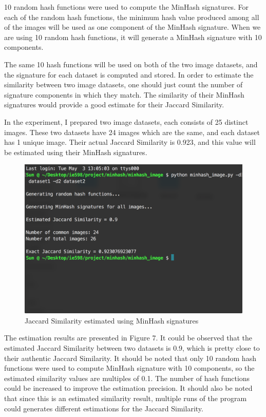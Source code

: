\documentclass[letterpaper,12pt]{article}
\begin{document}
10 random hash functions were used to compute the MinHash signatures. For each of the random hash functions, the minimum hash value produced among all of the images will be used as one component of the MinHash signature. When we are using 10 random hash functions, it will generate a MinHash signature with 10 components. 

The same 10 hash functions will be used on both of the two image datasets, and the signature for each dataset is computed and stored. In order to estimate the similarity between two image datasets, one should just count the number of signature components in which they match. The similarity of their MinHash signatures would provide a good estimate for their Jaccard Similarity.

In the experiment, I prepared two image datasets, each consists of 25 distinct images. These two datasets have 24 images which are the same, and each dataset has 1 unique image. Their actual Jaccard Similarity is 0.923, and this value will be estimated using their MinHash signatures.

\begin{figure}[h!]
	\centering
	\includegraphics[scale=0.5]{figures/figure_7}
	\caption{Jaccard Similarity estimated using MinHash signatures}
\end{figure}

The estimation results are presented in Figure 7. It could be observed that the estimated Jaccard Similarity between two datasets is 0.9, which is pretty close to their authentic Jaccard Similarity. It should be noted that only 10 random hash functions were used to compute MinHash signature with 10 components, so the estimated similarity values are multiples of 0.1. The number of hash functions could be increased to improve the estimation precision. It should also be noted that since this is an estimated similarity result, multiple runs of the program could generates different estimations for the Jaccard Similarity. 
\end{document}

